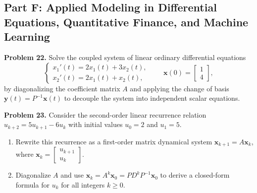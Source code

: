 \documentclass[11pt, letterpaper]{article}
\theoremstyle{definition}
\theoremstyle{remark}
\begin{document}
\subsection{Part F: Applied Modeling in Differential Equations, Quantitative Finance, and Machine Learning}

\textbf{Problem 22.}\label{prob:22}
Solve the coupled system of linear ordinary differential equations
\[
\begin{cases}
x_{1}'(t) = 2x_{1}(t) + 3x_{2}(t), \\
x_{2}'(t) = 2x_{1}(t) + x_{2}(t),
\end{cases}
\qquad \mathbf{x}(0) = \begin{bmatrix} 1 \\ 4 \end{bmatrix},
\]
by diagonalizing the coefficient matrix $A$ and applying the change of basis $\mathbf{y}(t) = P^{-1}\mathbf{x}(t)$ to decouple the system into independent scalar equations.

\textbf{Problem 23.}\label{prob:23}
Consider the second-order linear recurrence relation $u_{k+2} = 5u_{k+1} - 6u_{k}$ with initial values $u_{0} = 2$ and $u_{1} = 5$.
\begin{enumerate}[label=(\alph*)]
    \item Rewrite this recurrence as a first-order matrix dynamical system $\mathbf{x}_{k+1} = A\mathbf{x}_{k}$, where $\mathbf{x}_{k} = \begin{bmatrix} u_{k+1} \\ u_{k} \end{bmatrix}$.
    \item Diagonalize $A$ and use $\mathbf{x}_{k} = A^{k}\mathbf{x}_{0} = PD^{k}P^{-1}\mathbf{x}_{0}$ to derive a closed-form formula for $u_{k}$ for all integers $k \ge 0$.
\end{enumerate}
\end{document}
